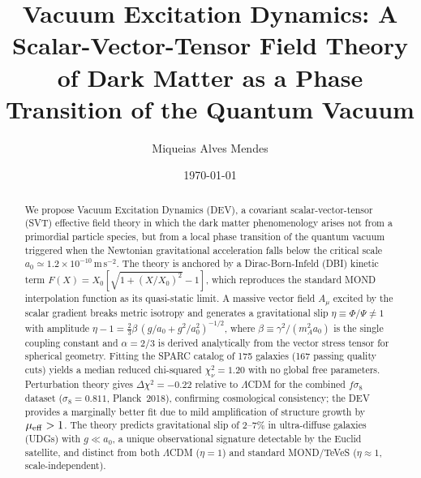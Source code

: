 \documentclass[aps,prd,twocolumn,showpacs,superscriptaddress]{revtex4-2}
\newcommand{\aO}{a_0}
\newcommand{\LCDM}{$\Lambda$CDM}
\begin{document}
\title{Vacuum Excitation Dynamics: A Scalar-Vector-Tensor Field Theory
       of Dark Matter as a Phase Transition of the Quantum Vacuum}

\author{Miqueias Alves Mendes}

\date{\today}

\begin{abstract}
We propose Vacuum Excitation Dynamics (DEV), a covariant
scalar-vector-tensor (SVT) effective field theory in which the dark
matter phenomenology arises not from a primordial particle species,
but from a local phase transition of the quantum vacuum triggered when
the Newtonian gravitational acceleration falls below the critical scale
$\aO \simeq 1.2\times10^{-10}$\,m\,s$^{-2}$.
The theory is anchored by a Dirac-Born-Infeld (DBI) kinetic term
$F(X) = X_0[\sqrt{1+(X/X_0)^2}-1]$,
which reproduces the standard MOND interpolation function as its
quasi-static limit.
A massive vector field $A_\mu$ excited by the scalar gradient breaks
metric isotropy and generates a gravitational slip
$\eta \equiv \Phi/\Psi \neq 1$ with amplitude
$\eta - 1 = \frac{2}{3}\beta\,(g/\aO+g^2/\aO^2)^{-1/2}$,
where $\beta \equiv \gamma^2/(m_A^2 \aO)$ is the single coupling constant
and $\alpha = 2/3$ is derived analytically from the vector stress tensor
for spherical geometry.
Fitting the SPARC catalog of 175 galaxies (167 passing quality cuts)
yields a median reduced chi-squared $\chi^2_\nu = 1.20$
with no global free parameters.
Perturbation theory gives $\Delta\chi^2 = -0.22$ relative to \LCDM{}
for the combined $f\sigma_8$ dataset ($\sigma_8 = 0.811$, Planck~2018),
confirming cosmological consistency; the DEV provides a marginally
better fit due to mild amplification of structure growth by
$\mu_{\rm eff} > 1$.
The theory predicts gravitational slip of $2$--$7\%$ in
ultra-diffuse galaxies (UDGs) with $g \ll \aO$, a unique
observational signature detectable by the Euclid satellite,
and distinct from both \LCDM{} ($\eta=1$) and
standard MOND/TeVeS ($\eta\approx 1$, scale-independent).
\end{abstract}


\maketitle
\end{document}
